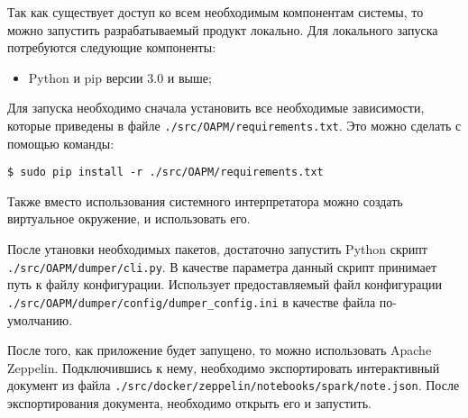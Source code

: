 Так как существует доступ ко всем необходимым компонентам системы, то можно запустить разрабатываемый продукт локально.
Для локального запуска потребуются следующие компоненты:

\begin{itemize}
    \item Python и pip версии 3.0 и выше;
\end{itemize}

Для запуска необходимо сначала установить все необходимые зависимости, которые приведены в файле \texttt{./src/OAPM/requirements.txt}.
Это можно сделать с помощью команды:
\begin{lstlisting}
$ sudo pip install -r ./src/OAPM/requirements.txt
\end{lstlisting}
Также вместо использования системного интерпретатора можно создать виртуальное окружение, и использовать его.

После утановки необходимых пакетов, достаточно запустить Python скрипт \texttt{./src/OAPM/dumper/cli.py}.
В качестве параметра данный скрипт принимает путь к файлу конфигурации.
Использует предоставляемый файл конфигурации \texttt{./src/OAPM/dumper/config/dumper\_config.ini} в качестве файла по-умолчанию.

После того, как приложение будет запущено, то можно использовать Apache Zeppelin.
Подключившись к нему, необходимо экспортировать интерактивный документ из файла \texttt{./src/docker/zeppelin/notebooks/spark/note.json}.
После экспортирования документа, необходимо открыть его и запустить.

